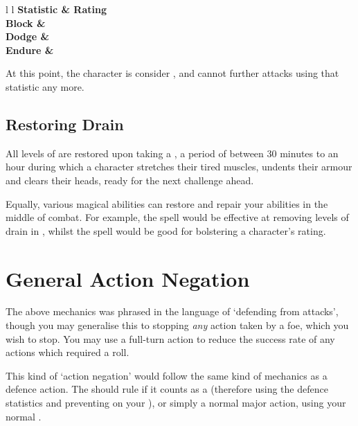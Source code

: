 \begin{center}
	\begin{rndtable}{l l}
		\bf Statistic	&	\bf Rating
		\\
		\bf Block	&	\defenseStar{1}{1}\defenseStar{1}{0}\defenseStar{0}{0}
		\\
		\bf Dodge & 
		\\
		\bf Endure & 
	\end{rndtable}
\end{center}

At this point, the character is consider , and cannot  further attacks using that statistic any more. 


\subsection{Restoring Drain}

All levels of  are restored upon taking a , a period of between 30 minutes to an hour during which a character stretches their tired muscles, undents their armour and clears their heads, ready for the next challenge ahead. 

Equally, various magical abilities can restore and repair your abilities in the middle of combat. For example, the  spell would be effective at removing levels of drain in , whilst the  spell would be good for bolstering a character's  rating.


\section{General Action Negation}

The above mechanics was phrased in the language of `defending from attacks', though you may generalise this to stopping {\it any} action taken by a foe, which you wish to stop. You may use a full-turn action to reduce the success rate of any actions which required a roll. 

This kind of `action negation' would follow the same kind of mechanics as a defence action. The  should rule if it counts as a  (therefore using the defence statistics and preventing  on your ), or simply a normal major action, using your normal . 

